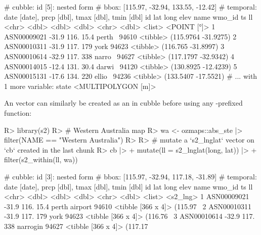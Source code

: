 \documentclass[
]{jss}
\begin{document}
\begin{CodeChunk}
\begin{CodeOutput}
# cubble:   id [5]: nested form
# bbox:     [115.97, -32.94, 133.55, -12.42]
# temporal: date [date], prcp [dbl], tmax [dbl], tmin [dbl]
  id            lat  long  elev name   wmo_id ts                        ll
  <chr>       <dbl> <dbl> <dbl> <chr>   <dbl> <list>           <POINT [°]>
1 ASN00009021 -31.9  116.  15.4 perth~  94610 <tibble> (115.9764 -31.9275)
2 ASN00010311 -31.9  117. 179   york    94623 <tibble>  (116.765 -31.8997)
3 ASN00010614 -32.9  117. 338   narro~  94627 <tibble> (117.1797 -32.9342)
4 ASN00014015 -12.4  131.  30.4 darwi~  94120 <tibble> (130.8925 -12.4239)
5 ASN00015131 -17.6  134. 220   ellio~  94236 <tibble> (133.5407 -17.5521)
# ... with 1 more variable: state <MULTIPOLYGON [m]>
\end{CodeOutput}
\end{CodeChunk}

An   vector can similarly be created as an  in cubble before using any -prefixed function:

\begin{CodeChunk}
\begin{CodeInput}
R> library(s2)
R> # Western Australia map
R> wa <- ozmaps::abs_ste |> filter(NAME == "Western Australia")
R> 
R> # mutate a `s2_lnglat` vector on `cb` created in the last chunk
R> cb |>
+   mutate(ll = s2_lnglat(long, lat)) |>
+   filter(s2_within(ll, wa))
\end{CodeInput}
\begin{CodeOutput}
# cubble:   id [3]: nested form
# bbox:     [115.97, -32.94, 117.18, -31.89]
# temporal: date [date], prcp [dbl], tmax [dbl], tmin [dbl]
  id            lat  long  elev name          wmo_id ts                 ll      
  <chr>       <dbl> <dbl> <dbl> <chr>          <dbl> <list>             <s2_lng>
1 ASN00009021 -31.9  116.  15.4 perth airport  94610 <tibble [366 x 4]> (115.97~
2 ASN00010311 -31.9  117. 179   york           94623 <tibble [366 x 4]> (116.76~
3 ASN00010614 -32.9  117. 338   narrogin       94627 <tibble [366 x 4]> (117.17~
\end{CodeOutput}
\end{CodeChunk}
\end{document}
